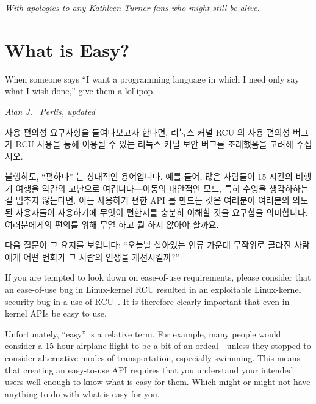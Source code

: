 
%
	 {\emph{With apologies to any Kathleen Turner fans who might
	  still be alive.}}

\section{What is Easy?}
\label{sec:easy:What is Easy?}
%
\epigraph{When someone says ``I want a programming language in which I
	  need only say what I wish done,'' give them a lollipop.}
	 {\emph{Alan J.~ Perlis, updated}}

사용 편의성 요구사항을 들여다보고자 한다면, 리눅스 커널 RCU 의 사용 편의성
버그가 RCU 사용을 통해 이용될 수 있는 리눅스 커널 보안 버그를 초래했음을 고려해
주십시오.

불행히도, ``편하다'' 는 상대적인 용어입니다.
예를 들어, 많은 사람들이 15 시간의 비행기 여행을 약간의 고난으로
여깁니다---이동의 대안적인 모드, 특히 수영을 생각하하는 걸 멈추지 않는다면.
이는 사용하기 편한 API 를 만드는 것은 여러분이 여러분의 의도된 사용자들이
사용하기에 무엇이 편한지를 충분히 이해할 것을 요구함을 의미합니다.
여러분에게의 편의를 위해 무얼 하고 뭘 하지 않아야 할까요.

다음 질문이 그 요지를 보입니다:
``오늘날 살아있는 인류 가운데 무작위로 골라진 사람에게 어떤 변화가 그 사람의
인생을 개선시킬까?''

\iffalse

If you are tempted to look down on ease-of-use requirements, please
consider that an ease-of-use bug in Linux-kernel RCU resulted in an
exploitable Linux-kernel security bug in a use of
RCU~\cite{McKenney:2019:CRS:3319647.3325836}.
It is therefore clearly important that even in-kernel APIs be easy to use.

Unfortunately, ``easy'' is a relative term.
For example, many people would consider a 15-hour airplane flight to be
a bit of an ordeal---unless they stopped to consider alternative modes
of transportation, especially swimming.
This means that creating an easy-to-use API requires that you understand
your intended users well enough to know what is easy for them.
Which might or might not have anything to do with what is easy for you.

